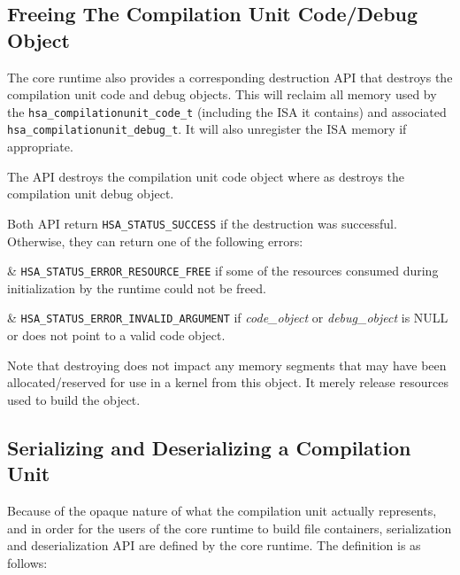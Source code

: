 \subsection{Freeing The Compilation Unit Code/Debug Object}

The core runtime also provides a corresponding destruction API that
destroys the compilation unit code and debug objects.  This will
reclaim all memory used by the
\texttt{hsa\_compilationunit\_code\_t} (including the ISA it
contains) and associated \texttt{hsa\_compilationunit\_debug\_t}. It
will also unregister the ISA memory if appropriate. 



The  API destroys the
compilation unit code object where as
 destroys the compilation
unit debug object.

Both API return \texttt{HSA\_STATUS\_SUCCESS} if the destruction was
successful. Otherwise, they can return one of the following errors:

\begin{easylist}

& \texttt{HSA\_STATUS\_ERROR\_RESOURCE\_FREE} if some of the
resources consumed during initialization by the runtime could not be
freed. 

& \texttt{HSA\_STATUS\_ERROR\_INVALID\_ARGUMENT} if {\itshape
code\_object} or {\itshape debug\_object} is NULL or does not point
to a valid code object.

\end{easylist} 

Note that destroying does not impact any memory segments that may
have been allocated/reserved for use in a kernel from this object.
It merely release resources used to build the object. 

\subsection{Serializing and Deserializing a Compilation Unit}

Because of the opaque nature of what the compilation unit actually
represents, and in order for the users of the core runtime to build
file containers, serialization and deserialization API are defined
by the core runtime. The definition is as follows:



